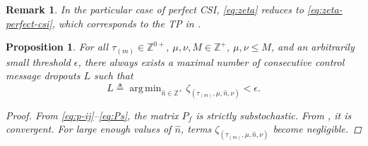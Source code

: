 \documentclass[journal,twoside,web]{ieeecolor}
\newtheorem{corollary}{Corollary}[theorem]
\newtheorem{remark}{Remark}
\newtheorem{proposition}{Proposition}
\begin{document}
\begin{remark}\label{rem:automatica-1}
    In the particular case of perfect CSI, \eqref{eq:zeta} reduces to \eqref{eq:zeta-perfect-csi}, which corresponds to the TP in \cite[Eq. (19)]{yZL-2025-automatica}.
\end{remark}



\begin{proposition}\label{prop:L}
For all $\tau_{(m)} \in \mathbb{Z}^{0+}$,  $\mu,\nu,M \in\mathbb{Z}^{+}$, $\mu,\nu\leq M$, and an arbitrarily small threshold $\epsilon$, there always exists a  maximal number of consecutive control message dropouts $L$ such that
\begin{equation}\label{eq:L}
    L \triangleq \mathop{\mathrm{arg\,min}}_{\hat{n} \in \mathbb{Z}^{+}}
    \zeta_{(\tau_{(m)},\mu,\hat{n},\nu)}<\epsilon.
\end{equation}
\begin{proof}
From \eqref{eq:p-ij}–\eqref{eq:Ps}, the matrix $P_{f}$ is strictly substochastic.
From \cite[Th. 8.1.22 and 5.6.12]{horn2012matrix}, it is convergent. For large enough values of $\hat{n}$, terms $\zeta_{(\tau_{(m)},\mu,\hat{n},\nu)}$ become negligible. %
\end{proof}
\end{proposition}
\end{document}
